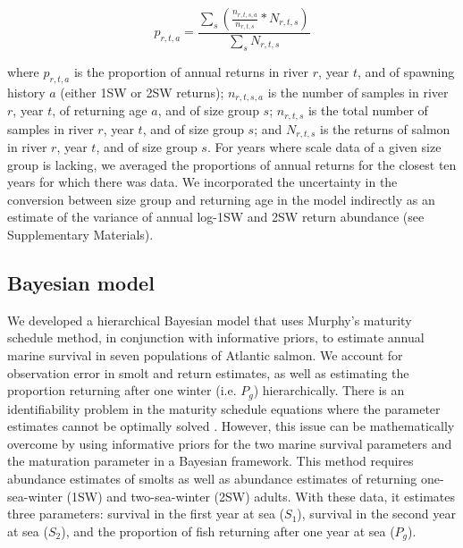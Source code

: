 \documentclass[12pt]{article}
\newcommand{\So}{$S_{1}$\xspace}
\newcommand{\St}{$S_{2}$\xspace}
\newcommand{\Pg}{$P_g$\xspace}
\begin{document}
\begin{equation}
    p_{r,t,a} = \frac{\sum_{s}{(\frac{n_{r,t,s,a}}{n_{r,t,s}} * N_{r,t,s})}}{\sum_{s}{N_{r,t,s}}}
\end{equation}

where $p_{r,t,a}$ is the proportion of annual returns in river $r$, year $t$,
and of spawning history $a$ (either 1SW or 2SW returns); $n_{r,t,s,a}$ is the
number of samples in river $r$, year $t$, of returning age $a$, and of size
group $s$; $n_{r,t,s}$ is the total number of samples in river $r$, year $t$,
and of size group $s$; and $N_{r,t,s}$ is the returns of salmon
in river $r$, year $t$, and of size group $s$.
For years where scale data of a given size group is lacking,
we averaged the proportions of annual returns
for the closest ten years for which there was data.
We incorporated the uncertainty in the conversion between
size group and returning age in the model indirectly as an estimate
of the variance of annual log-1SW and 2SW return abundance (see Supplementary Materials).

\subsection*{Bayesian model}

We developed a hierarchical Bayesian model that uses Murphy's maturity
schedule method, in conjunction with informative priors, to estimate annual
marine survival in seven populations of Atlantic salmon. We account for
observation error in smolt and return estimates, as well as estimating the
proportion returning after one winter (i.e. \Pg) hierarchically.
There is an identifiability problem in the maturity schedule equations where
the parameter estimates cannot be optimally solved \citep{Chaput2003a}.
However, this issue can be mathematically overcome by
using informative priors for the two marine survival parameters and the maturation
parameter in a Bayesian framework.
This method requires abundance estimates of smolts as well as abundance estimates
of returning one-sea-winter (1SW) and two-sea-winter (2SW) adults. With these data,
it estimates three parameters: survival in the first year at sea (\So), survival
in the second year at sea (\St), and the proportion of fish returning after one
year at sea (\Pg).
\end{document}
